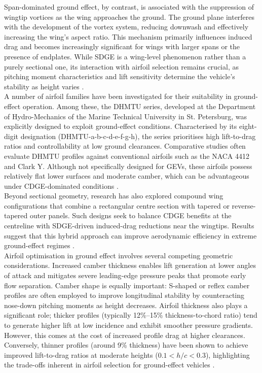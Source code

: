 \noindent Span-dominated ground effect, by contrast, is associated with the suppression of wingtip vortices as the wing approaches the ground. The ground plane interferes with the development of the vortex system, reducing downwash and effectively increasing the wing's aspect ratio. This mechanism primarily influences induced drag and becomes increasingly significant for wings with larger spans or the presence of endplates. While SDGE is a wing-level phenomenon rather than a purely sectional one, its interaction with airfoil selection remains crucial, as pitching moment characteristics and lift sensitivity determine the vehicle's stability as height varies \cite{ASME_CFD_simulation}.\\

\noindent A number of airfoil families have been investigated for their suitability in ground-effect operation. Among these, the DHMTU series, developed at the Department of Hydro-Mechanics of the Marine Technical University in St. Petersburg, was explicitly designed to exploit ground-effect conditions. Characterised by its eight-digit designation (DHMTU-a-b-c-d-e-f-g-h), the series prioritises high lift-to-drag ratios and controllability at low ground clearances. Comparative studies often evaluate DHMTU profiles against conventional airfoils such as the NACA 4412 and Clark Y. Although not specifically designed for GEVs, these airfoils possess relatively flat lower surfaces and moderate camber, which can be advantageous under CDGE-dominated conditions \cite{WIGE-vehicles}.\\

\noindent Beyond sectional geometry, research has also explored compound wing configurations that combine a rectangular centre section with tapered or reverse-tapered outer panels. Such designs seek to balance CDGE benefits at the centreline with SDGE-driven induced-drag reductions near the wingtips. Results suggest that this hybrid approach can improve aerodynamic efficiency in extreme ground-effect regimes \cite{Compound_wing_investigation}.\\

\noindent Airfoil optimisation in ground effect involves several competing geometric considerations. Increased camber thickness enables lift generation at lower angles of attack and mitigates severe leading-edge pressure peaks that promote early flow separation. Camber shape is equally important: S-shaped or reflex camber profiles are often employed to improve longitudinal stability by counteracting nose-down pitching moments as height decreases. Airfoil thickness also plays a significant role; thicker profiles (typically 12\%--15\% thickness-to-chord ratio) tend to generate higher lift at low incidence and exhibit smoother pressure gradients. However, this comes at the cost of increased profile drag at higher clearances. Conversely, thinner profiles (around 9\% thickness) have been shown to achieve improved lift-to-drag ratios at moderate heights ($0.1 < h/c < 0.3$), highlighting the trade-offs inherent in airfoil selection for ground-effect vehicles \cite{ISU_thesis}\cite{Rozhdestvensky_WIG-book}\cite{SPRINGER_WIG-book}.\\

